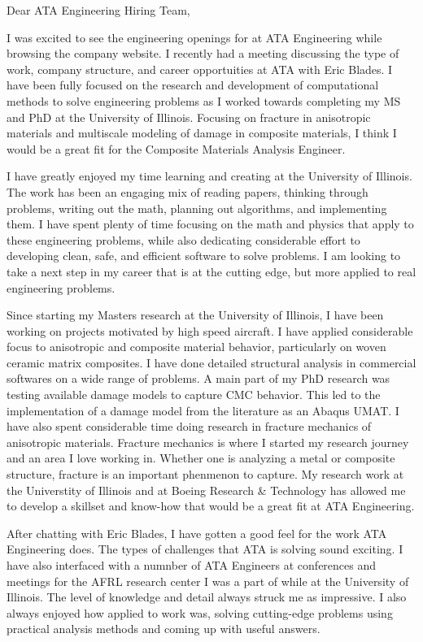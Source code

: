 \documentclass{resume}
\begin{document}
\vspace{0.5in}
Dear ATA Engineering Hiring Team,

I was excited to see the engineering openings for at ATA Engineering
while browsing the company website.
%
I recently had a meeting discussing the type of work, company
structure, and career opportuities at ATA with Eric Blades.
%
I have been fully focused on the research and development of
computational methods to solve engineering problems as I worked towards
completing my MS and PhD at the University of Illinois.
%
Focusing on fracture in anisotropic materials and multiscale modeling
of damage in composite materials, I think I would be a great fit for
the Composite Materials Analysis Engineer.
%

I have greatly enjoyed my time learning and creating at the University
of Illinois.
%
The work has been an engaging mix of reading papers, thinking through
problems, writing out the math, planning out algorithms, and
implementing them.
%
I have spent plenty of time focusing on the math and physics that
apply to these engineering problems, while also dedicating
considerable effort to developing clean, safe, and efficient software
to solve problems.
%
I am looking to take a next step in my career that is at the cutting
edge, but more applied to real engineering problems.
%

Since starting my Masters research at the University of Illinois, I
have been working on projects motivated by high speed aircraft.
%
I have applied considerable focus to anisotropic and composite
material behavior, particularly on woven ceramic matrix
composites.
%
I have done detailed structural analysis in commercial
softwares on a wide range of problems.
%
A main part of my PhD research was testing available damage models to
capture CMC behavior.
%
This led to the implementation of a damage model from the
literature as an Abaqus UMAT.
%
I have also spent considerable time doing research in fracture
mechanics of anisotropic materials.
%
Fracture mechanics is where I started my research journey and an area
I love working in.
%
Whether one is analyzing a metal or composite structure, fracture is an
important phenmenon to capture.
%
My research work at the Universtity of Illinois and at Boeing
Research \& Technology has allowed me to develop a skillset and
know-how that would be a great fit at ATA Engineering.
%

After chatting with Eric Blades, I have gotten a good feel for the
work ATA Engineering does.
%
The types of challenges that ATA is solving sound exciting.
%
I have also interfaced with a numnber of ATA Engineers at conferences
and meetings for the AFRL research center I was a part of while at the
University of Illinois.
%
The level of knowledge and detail always struck me as impressive.
%
I also always enjoyed how applied to work was, solving cutting-edge
problems using practical analysis methods and coming up with useful
answers.
%
\end{document}
